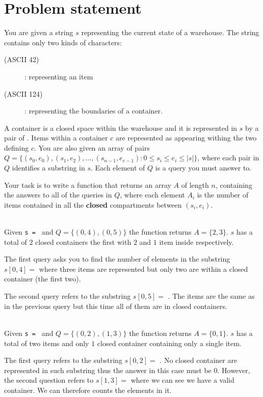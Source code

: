 \section{Problem statement}
\begin{exercise}
	You are given a string $s$ representing the current state of a warehouse. The string contains
	only two kinds of characters: 
	\begin{description}
		\item[\bsq{\textbf{\texttt{*}}}(ASCII 42)]: representing an item 
		\item[\bsq{\textbf{\texttt{|}}}(ASCII 124)]: representing the boundaries of a container.
	\end{description}
	
	A container is a closed space within the warehouse and it is represented in $s$ by a pair of
	\bsq{\texttt{|}}. Items within a container $c$ are represented as \bsq{\texttt{*}} appearing
	withing the two \bsq{\texttt{|}} defining $c$. You are also given an array of pairs $Q = \{(s_0,
	e_0),(s_1, e_2),\ldots,(s_{n-1}, e_{e-1}) : 0 \leq s_i \leq e_i \leq |s|\}$, where
	each pair in $Q$ identifies a substring in $s$. Each element of $Q$ is a query you must answer to.
	
	Your task is to write a function that returns an array $A$ of length $n$, containing the answers
	to all of the queries in $Q$, where each element $A_i$ is the number of items contained in all
	the \textbf{closed} compartments between $(s_i, e_i)$.	

\begin{example}
	\hfill \\
	Given \texttt{s = \bsq{|**|*|*}} and $Q = \{(0,4),(0,5)\}$ the function returns $A=\{2,3\}$. $s$
	has a total of $2$ closed containers the first with $2$ and $1$ item inside respectively.
	
	The first query asks you to find the number of elements in the substring $s[0,4]=$
	\texttt{\bsq{|**|*}} where three items are represented but only two are within a closed
	container (the first two).
	
	The second query refers to the substring $s[0,5]=$ \texttt{\bsq{|**|*|}}. The items are the same
	as in the previous query but this time all of them are in closed containers.
	
\end{example}

\begin{example}
	\hfill \\
	Given \texttt{s = \bsq{*|*|}} and $Q = \{(0,2),(1,3)\}$ the function returns $A=\{0,1\}$. $s$
	has a total of two items and only $1$ closed container containing only a single item.

	The first query refers to the substring $s[0,2]=$ \texttt{\bsq{*|*}}. No closed container are
	represented in such substring thus the answer in this case must be $0$. However, the second
	question refers to  $s[1,3]=$ \texttt{\bsq{|*|}} where we can see we have a valid container. We
	can therefore counts the elements in it.
\end{example}

\end{exercise}
